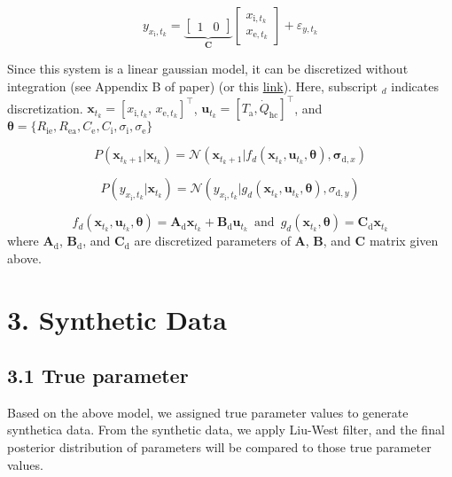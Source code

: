 \documentclass[
]{article}
\begin{document}
\[
y_{x_\text{i},t_k}=\underbrace{\begin{bmatrix}1&0\end{bmatrix}}_{\textbf{C}}\begin{bmatrix}x_{\text{i},t_k}\\x_{\text{e},t_k}\end{bmatrix}+\varepsilon_{y,t_k}
\]

Since this system is a linear gaussian model, it can be discretized
without integration (see Appendix B of paper) (or this
\href{https://github.com/ecosang/misc/blob/master/discretization.pdf}{link}).
Here, subscript \(_d\) indicates discretization.
\(\textbf{x}_{t_k}=\left[x_{\text{i},t_k},\,x_{\text{e},t_k}\right]^\intercal\),
\(\textbf{u}_{t_k}=\left[T_{\text{a}},\dot{Q}_{\text{hc}}\right]^\intercal\),
and
\(\boldsymbol{\theta}=\{R_{\text{ie}}, R_{\text{ea}}, C_{\text{e}}, C_{\text{i}}, \sigma_\text{i}, \sigma_\text{e}\}\)

\[P(\textbf{x}_{t_k+1}|\textbf{x}_{t_k})=\mathcal{N}(\textbf{x}_{t_k+1}|f_d\left(\textbf{x}_{t_k},\textbf{u}_{t_k},\boldsymbol{\theta}\right),\boldsymbol{\sigma}_{\text{d},x})\]

\[P(y_{x_\text{i},t_k}|\textbf{x}_{t_k})=\mathcal{N}(y_{x_\text{i},t_k}|g_d\left(\textbf{x}_{t_k},\textbf{u}_{t_k},\boldsymbol{\theta}\right),\sigma_{\text{d},y})\]

\[f_d\left(\textbf{x}_{t_k},\textbf{u}_{t_k},\boldsymbol{\theta}\right)=\textbf{A}_\text{d}\textbf{x}_{t_k}+\textbf{B}_\text{d}\textbf{u}_{t_k}\,\text{ and }\,g_d\left(\textbf{x}_{t_k},\boldsymbol{\theta}\right)=\textbf{C}_\text{d}\textbf{x}_{t_k}\]
where \(\textbf{A}_\text{d}\), \(\textbf{B}_\text{d}\), and
\(\textbf{C}_\text{d}\) are discretized parameters of \(\textbf{A}\),
\(\textbf{B}\), and \(\textbf{C}\) matrix given above.

\hypertarget{synthetic-data}{%
\section{3. Synthetic Data}\label{synthetic-data}}

\hypertarget{true-parameter}{%
\subsection{3.1 True parameter}\label{true-parameter}}

Based on the above model, we assigned true parameter values to generate
synthetica data. From the synthetic data, we apply Liu-West filter, and
the final posterior distribution of parameters will be compared to those
true parameter values.
\end{document}
